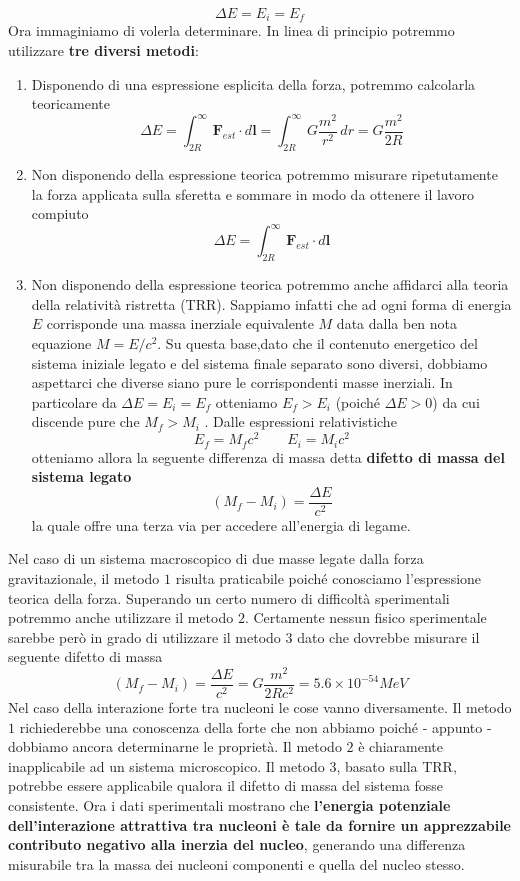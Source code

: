 \begin{equation}
	\Delta E = E_{i} = E_{f}
	\label{eq:binding-energy-experimental}
\end{equation}
Ora immaginiamo di volerla determinare.
In linea di principio potremmo utilizzare \textbf{tre diversi metodi}:
\begin{enumerate}
	\tightlist
	\item Disponendo di una espressione esplicita della forza, potremmo
	calcolarla teoricamente
	\[
		\Delta E = \int_{2 R}^{\infty} \bm{F}_{est} \cdot d\bm{l} = \int_{2 R}^{\infty} G \frac{m^{2}}{r^{2}} \, dr
		= G \frac{m^{2}}{2R}
	\]
	\item
	Non disponendo della espressione teorica potremmo misurare
	ripetutamente la forza applicata sulla sferetta e sommare in modo da
	ottenere il lavoro compiuto
	\[
		\Delta E = \int _{2R}^{\infty} \bm{F}_{est} \cdot d\bm{l}
	\]
	\item
	Non disponendo della espressione teorica potremmo anche affidarci alla
	teoria della relatività ristretta (TRR).
	Sappiamo infatti che ad ogni forma di energia $E$ corrisponde una massa inerziale equivalente
	\(M\) data dalla ben nota equazione \(M=E/c^{2}\).
	Su questa base,dato che il contenuto energetico del sistema iniziale legato e del
	sistema finale separato sono diversi, dobbiamo aspettarci che diverse
	siano pure le corrispondenti masse inerziali. In particolare da
	\(\Delta E = E_{i} = E_{f}\) otteniamo \(E_{f} > E_{i}\) (poiché
	\(\Delta E >0\)) da cui discende pure che \(M_{f} > M_{i}\) .
	Dalle espressioni relativistiche
	\[
		E_{f} = M_{f}c^{2} \qquad E_{i} = M_{i}c^{2}
	\] otteniamo allora la seguente differenza di massa detta
	\textbf{difetto di massa del sistema legato}
	\[
		(M_{f}-M_{i}) = \frac{\Delta E}{c^{2}}
	\] la quale offre una terza via per accedere all'energia di legame.
\end{enumerate}

Nel caso di un sistema macroscopico di due masse legate dalla forza
gravitazionale, il metodo \(1\) risulta praticabile poiché conosciamo
l'espressione teorica della forza. Superando un certo numero di
difficoltà sperimentali potremmo anche utilizzare il metodo \(2.\)
Certamente nessun fisico sperimentale sarebbe però in grado di
utilizzare il metodo \(3\) dato che dovrebbe misurare il seguente
difetto di massa
\[
	(M_{f}-M_{i}) = \frac{\Delta E}{c^{2}} = G \frac{m^{2}}{2Rc^{2}} = 5.6 \times 10^{-54} MeV
\]
Nel caso della interazione forte tra nucleoni le cose vanno
diversamente. Il metodo \(1\) richiederebbe una conoscenza della forte
che non abbiamo poiché - appunto - dobbiamo ancora determinarne le
proprietà. Il metodo \(2\) è chiaramente inapplicabile ad un sistema
microscopico. Il metodo \(3\), basato sulla TRR, potrebbe essere
applicabile qualora il difetto di massa del sistema fosse consistente.
Ora i dati sperimentali mostrano che \textbf{l'energia potenziale
dell'interazione attrattiva tra nucleoni è tale da fornire un
apprezzabile contributo negativo alla inerzia del nucleo}, generando una
differenza misurabile tra la massa dei nucleoni componenti e quella del
nucleo stesso.

